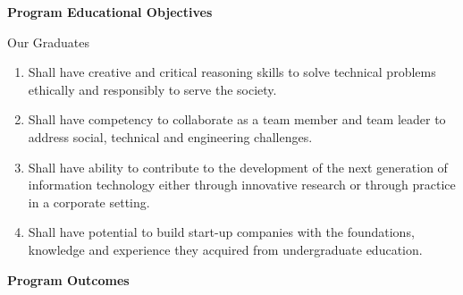 \documentclass[a4 paper,11pt]{report}
\begin{document}
\begin{center}
\textbf{Program Educational Objectives}
\end{center}
Our Graduates 

\begin{enumerate}
\item Shall have creative and critical reasoning skills to solve technical problems ethically and responsibly to serve the society.
\item Shall have competency to collaborate as a team member and team leader to address social, technical and engineering challenges.
\item Shall have ability to contribute to the development of the next generation of information technology either through innovative research or through practice in a corporate setting.
\item Shall have potential to build start-up companies with the foundations, knowledge and experience they acquired from undergraduate education.
\end{enumerate}
\newpage
\begin{center}

\textbf{Program Outcomes}
\end{center}
\end{document}
